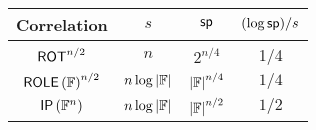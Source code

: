 \begin{figure}
\begin{center}
{\renewcommand{\arraystretch}{2}
\begin{tabular}{|c|c|c|c|}\hline
Correlation & $s$ & $ \mathsf{sp} $ & $ (\log\mathsf{sp})/s $\\ \hline
$\ROT[n/2]$ & $n$ & $2^{n/4}$ & 1/4\\\hline 
$\ROLE[\bbF]^{n/2}$ & $n\log\left\vert{\ensuremath{{\mathbb F}}}\right\vert$ & $\left\vert{\ensuremath{{\mathbb F}}}\right\vert^{n/4}$ & $1/4$\\\hline
$\IP[\bbF^n]$ & $n\log\left\vert{\ensuremath{{\mathbb F}}}\right\vert$ & $\left\vert{\ensuremath{{\mathbb F}}}\right\vert^{n/2}$ & $1/2$\\\hline 
\end{tabular}
}
\end{center}
\label{fig:sp} 
\end{figure}






